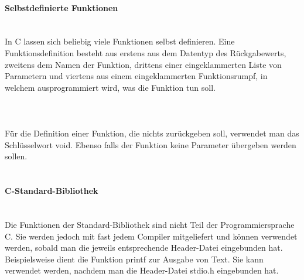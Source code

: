 \paragraph{Selbstdefinierte Funktionen}
\ \\
In C lassen sich beliebig viele Funktionen selbst definieren. Eine Funktionsdefinition besteht aus erstens aus dem Datentyp des Rückgabewerts, zweitens dem Namen der Funktion, drittens einer eingeklammerten Liste von Parametern und viertens aus einem eingeklammerten Funktionsrumpf, in welchem ausprogrammiert wird, was die Funktion tun soll.\\
\ \\
\\
\ \\
Für die Definition einer Funktion, die nichts zurückgeben soll, verwendet man das Schlüsselwort void. Ebenso falls der Funktion keine Parameter übergeben werden sollen.\\
\ \\

\paragraph{C-Standard-Bibliothek}
\ \\
Die Funktionen der Standard-Bibliothek sind nicht Teil der Programmiersprache C. Sie werden jedoch mit fast jedem Compiler mitgeliefert und können verwendet werden, sobald man die jeweils entsprechende Header-Datei eingebunden hat. Beispielsweise dient die Funktion printf zur Ausgabe von Text. Sie kann verwendet werden, nachdem man die Header-Datei stdio.h eingebunden hat.\\
\ \\
\ \\
